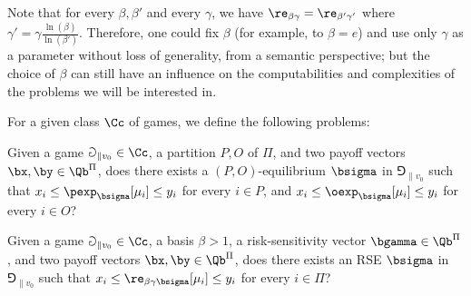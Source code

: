 Note that for every $\beta, \beta'$ and every $\gamma$, we have $\re_{\beta\gamma} = \re_{\beta'\gamma'}$ where $\gamma' = \gamma \frac{\ln(\beta)}{\ln(\beta')}$.
Therefore, one could fix $\beta$ (for example, to $\beta = e$) and use only $\gamma$ as a parameter without loss of generality, from a semantic perspective; but the choice of $\beta$ can still have an influence on the computabilities and complexities of the problems we will be interested in.



For a given class $\Cc$ of games, we define the following problems:

\begin{definition}
    Given a game $\Game_{\|v_0} \in \Cc$, a partition $P, O$ of $\Pi$, and two payoff vectors $\bx, \by \in \Qb^\Pi$, does there exists a $(P, O)$-equilibrium $\bsigma$ in $\Game_{\|v_0}$ such that $x_i \leq \pexp_{\bsigma}[\mu_i] \leq y_i$ for every $i \in P$, and $x_i \leq \oexp_{\bsigma}[\mu_i] \leq y_i$ for every $i \in O$?
\end{definition}

\begin{definition}
    Given a game $\Game_{\|v_0} \in \Cc$, a basis $\beta > 1$, a risk-sensitivity vector $\bgamma \in \Qb^\Pi$, and two payoff vectors $\bx, \by \in \Qb^\Pi$, does there exists an RSE $\bsigma$ in $\Game_{\|v_0}$ such that $x_i \leq \re_{\beta\gamma\bsigma}[\mu_i] \leq y_i$ for every $i \in \Pi$?
\end{definition}


